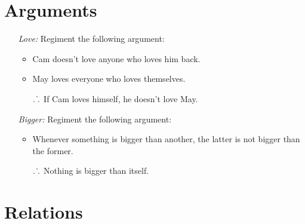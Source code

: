 \documentclass[a4paper, 11pt]{article} %
\def\therefore{\ensuremath{\ldotp\dot\,\ldotp}}
\begin{document}
\section*{Arguments}

\begin{enumerate}
  \item[\it Love:] Regiment the following argument:
    \begin{itemize}
      \item Cam doesn't love anyone who loves him back.
      \item May loves everyone who loves themselves.
      \item[\therefore] If Cam loves himself, he doesn't love May.
    \end{itemize}
  \item[\it Bigger:] Regiment the following argument:
    \begin{itemize}
      \item Whenever something is bigger than another, the latter is not bigger than the former.
      \item[\therefore] Nothing is bigger than itself.
    \end{itemize}
\end{enumerate}


\section*{Relations}
\end{document}
